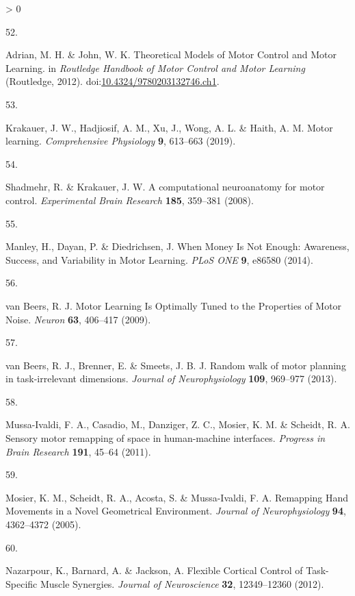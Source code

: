 \documentclass[
  a4paper,
]{article}
\newlength{\cslhangindent}
\newlength{\csllabelwidth}
\newenvironment{CSLReferences}[2] %
 {%
  \setlength{\parindent}{0pt}
  \ifodd #1 \everypar{\setlength{\hangindent}{\cslhangindent}}\ignorespaces\fi
  \ifnum #2 > 0
  \setlength{\parskip}{#2\baselineskip}
  \fi
 }%
 {}
\newcommand{\CSLLeftMargin}[1]{\parbox[t]{\csllabelwidth}{#1}}
\newcommand{\CSLRightInline}[1]{\parbox[t]{\linewidth - \csllabelwidth}{#1}\break}
\begin{document}
\begin{CSLReferences}{0}{0}
\leavevmode\hypertarget{ref-adrianTheoreticalModelsMotor2012}{}%
\CSLLeftMargin{52. }
\CSLRightInline{Adrian, M. H. \& John, W. K. Theoretical {Models} of
{Motor Control} and {Motor Learning}. in \emph{Routledge {Handbook} of
{Motor Control} and {Motor Learning}} ({Routledge}, 2012).
doi:\href{https://doi.org/10.4324/9780203132746.ch1}{10.4324/9780203132746.ch1}.}

\leavevmode\hypertarget{ref-Krakauer2019}{}%
\CSLLeftMargin{53. }
\CSLRightInline{Krakauer, J. W., Hadjiosif, A. M., Xu, J., Wong, A. L.
\& Haith, A. M. Motor learning. \emph{Comprehensive Physiology}
\textbf{9}, 613--663 (2019).}

\leavevmode\hypertarget{ref-Shadmehr2008}{}%
\CSLLeftMargin{54. }
\CSLRightInline{Shadmehr, R. \& Krakauer, J. W. A computational
neuroanatomy for motor control. \emph{Experimental Brain Research}
\textbf{185}, 359--381 (2008).}

\leavevmode\hypertarget{ref-manleyWhenMoneyNot2014}{}%
\CSLLeftMargin{55. }
\CSLRightInline{Manley, H., Dayan, P. \& Diedrichsen, J. When {Money Is
Not Enough}: {Awareness}, {Success}, and {Variability} in {Motor
Learning}. \emph{PLoS ONE} \textbf{9}, e86580 (2014).}

\leavevmode\hypertarget{ref-vanbeersMotorLearningOptimally2009}{}%
\CSLLeftMargin{56. }
\CSLRightInline{van Beers, R. J. Motor {Learning Is Optimally Tuned} to
the {Properties} of {Motor Noise}. \emph{Neuron} \textbf{63}, 406--417
(2009).}

\leavevmode\hypertarget{ref-vanbeersRandomWalkMotor2013}{}%
\CSLLeftMargin{57. }
\CSLRightInline{van Beers, R. J., Brenner, E. \& Smeets, J. B. J. Random
walk of motor planning in task-irrelevant dimensions. \emph{Journal of
Neurophysiology} \textbf{109}, 969--977 (2013).}

\leavevmode\hypertarget{ref-Mussa-IvaldiSensoryMotorRemapping2011}{}%
\CSLLeftMargin{58. }
\CSLRightInline{Mussa-Ivaldi, F. A., Casadio, M., Danziger, Z. C.,
Mosier, K. M. \& Scheidt, R. A. Sensory motor remapping of space in
human-machine interfaces. \emph{Progress in Brain Research}
\textbf{191}, 45--64 (2011).}

\leavevmode\hypertarget{ref-MosierRemappingHandMovements2005}{}%
\CSLLeftMargin{59. }
\CSLRightInline{Mosier, K. M., Scheidt, R. A., Acosta, S. \&
Mussa-Ivaldi, F. A. Remapping {Hand Movements} in a {Novel Geometrical
Environment}. \emph{Journal of Neurophysiology} \textbf{94}, 4362--4372
(2005).}

\leavevmode\hypertarget{ref-nazarpourFlexibleCorticalControl2012}{}%
\CSLLeftMargin{60. }
\CSLRightInline{Nazarpour, K., Barnard, A. \& Jackson, A. Flexible
{Cortical Control} of {Task}-{Specific Muscle Synergies}. \emph{Journal
of Neuroscience} \textbf{32}, 12349--12360 (2012).}


\end{CSLReferences}
\end{document}
